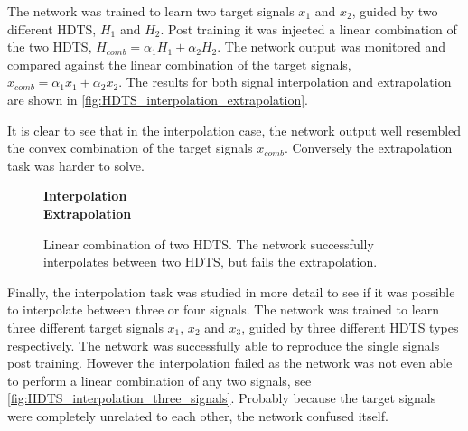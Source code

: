 \documentclass[10pt,a4paper, final]{report} %
\begin{document}
The network was trained to learn two target signals $x_1$ and $x_2$, guided by two different HDTS, $H_1$ and $H_2$. Post training it was injected a linear combination of the two HDTS, $H_{comb} = \alpha_1 H_1 + \alpha_2 H_2$. The network output was monitored and compared against the linear combination of the target signals, $x_{comb} = \alpha_1 x_1 + \alpha_2 x_2$. The results for both signal interpolation and extrapolation are shown in \autoref{fig:HDTS_interpolation_extrapolation}.

It is clear to see that in the interpolation case, the network output well resembled the convex combination of the target signals $x_{comb}$. Conversely the extrapolation task was harder to solve.



\begin{figure}[H]
\centering
\textbf{Interpolation}
\\
\textbf{Extrapolation}
\caption{Linear combination of two HDTS. The network successfully interpolates between two HDTS, but fails the extrapolation.}
\label{fig:HDTS_interpolation_extrapolation}
\end{figure}

Finally, the interpolation task was studied in more detail to see if it was possible to interpolate between three or four signals. The network was trained to learn three different target signals $x_1$, $x_2$ and $x_3$, guided by three different HDTS types respectively. The network was successfully able to reproduce the single signals post training. However the interpolation failed as the network was not even able to perform a linear combination of any two signals, see \autoref{fig:HDTS_interpolation_three_signals}. 
Probably because the target signals were completely unrelated to each other, the network confused itself.
\end{document}
